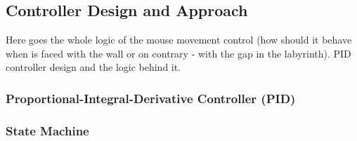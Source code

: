 \subsection{Controller Design and Approach}

Here goes the whole logic of the mouse movement control (how should it behave when is faced with the wall or on contrary - with the gap in the labyrinth). PID controller design and the logic behind it.

\subsubsection{Proportional-Integral-Derivative Controller (PID)}

\subsubsection{State Machine}



